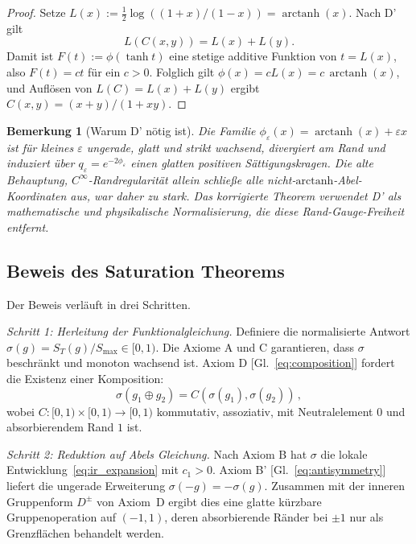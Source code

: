 \documentclass[aps,prd,twocolumn,superscriptaddress,nofootinbib]{revtex4-2}
\newtheorem{remark}{Bemerkung}
\begin{document}
\begin{proof}
Setze $L(x):=\frac12\log((1+x)/(1-x))=\operatorname{arctanh}(x)$. Nach D' gilt
\[
  L(C(x,y))=L(x)+L(y).
\]
Damit ist $F(t):=\phi(\tanh t)$ eine stetige additive Funktion von $t=L(x)$, also $F(t)=ct$ für ein $c>0$. Folglich gilt $\phi(x)=cL(x)=c\,\operatorname{arctanh}(x)$, und Auflösen von $L(C)=L(x)+L(y)$ ergibt $C(x,y)=(x+y)/(1+xy)$.
\end{proof}

\begin{remark}[Warum D' nötig ist]
Die Familie $\phi_\varepsilon(x)=\operatorname{arctanh}(x)+\varepsilon x$ ist für kleines $\varepsilon$ ungerade, glatt und strikt wachsend, divergiert am Rand und induziert über $q_\varepsilon=e^{-2\phi_\varepsilon}$ einen glatten positiven Sättigungskragen. Die alte Behauptung, $C^\infty$-Randregularität allein schließe alle nicht-$\mathrm{arctanh}$-Abel-Koordinaten aus, war daher zu stark. Das korrigierte Theorem verwendet D' als mathematische und physikalische Normalisierung, die diese Rand-Gauge-Freiheit entfernt.
\end{remark}

\subsection{Beweis des Saturation Theorems}

Der Beweis verläuft in drei Schritten.

\textit{Schritt 1: Herleitung der Funktionalgleichung.}
Definiere die normalisierte Antwort $\sigma(g) = S_T(g)/S_{\max} \in [0, 1)$. Die Axiome A und C garantieren, dass $\sigma$ beschränkt und monoton wachsend ist. Axiom D [Gl.~\eqref{eq:composition}] fordert die Existenz einer Komposition:
\begin{equation}
\sigma(g_1 \oplus g_2) = C(\sigma(g_1), \sigma(g_2))\,,
\label{eq:normalized_composition}
\end{equation}
wobei $C: [0,1) \times [0,1) \to [0,1)$ kommutativ, assoziativ, mit Neutralelement $0$ und absorbierendem Rand $1$ ist.

\textit{Schritt 2: Reduktion auf Abels Gleichung.}
Nach Axiom B hat $\sigma$ die lokale Entwicklung~\eqref{eq:ir_expansion} mit $c_1 > 0$. Axiom B' [Gl.~\eqref{eq:antisymmetry}] liefert die ungerade Erweiterung $\sigma(-g)=-\sigma(g)$. Zusammen mit der inneren Gruppenform $D^\pm$ von Axiom~D ergibt dies eine glatte kürzbare Gruppenoperation auf $(-1,1)$, deren absorbierende Ränder bei $\pm 1$ nur als Grenzflächen behandelt werden.
\end{document}
